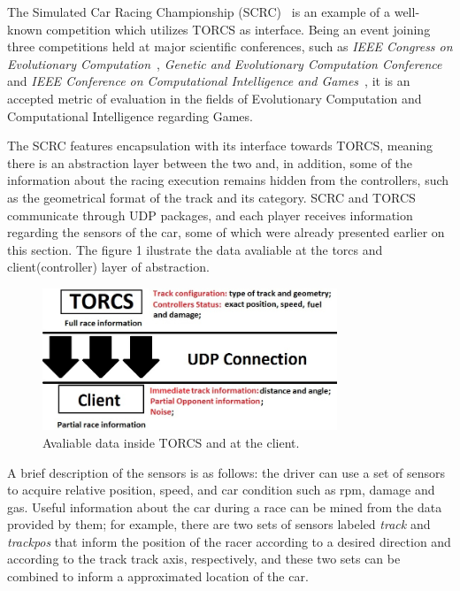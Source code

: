 	The Simulated Car Racing Championship (SCRC)~\cite{SCR} is an example of a well-known competition which utilizes
	TORCS as interface. Being an event joining three competitions held at major scientific conferences, such as
	\emph{IEEE Congress on Evolutionary Computation}~\cite{CEC}, \emph{Genetic and Evolutionary Computation
	Conference}~\cite{GECCO} and \emph{IEEE Conference on Computational Intelligence and Games}~\cite{CIG}, it is
	an accepted	metric of evaluation in the fields of Evolutionary Computation and Computational Intelligence
	regarding Games.
	
	The SCRC features encapsulation with its interface towards TORCS, meaning there is an abstraction layer between
	the two and, in addition, some of the information about the racing execution remains hidden from the controllers,
	such as the geometrical format of the track and its category. SCRC and TORCS communicate through UDP packages,
	and each player receives information regarding the sensors of the car, some of which were already presented
	earlier on this section. The figure 1 ilustrate the data avaliable at the torcs and client(controller) layer 
	of abstraction. 

   	\begin{figure}[h]
	\centering
	\includegraphics[width=250pt]{Figure1}
	\caption{\label{fig:Figure1}Avaliable data inside TORCS and at the client.}
	\end{figure}
	
	A brief description of the sensors is as follows: the driver can use a set of sensors to acquire relative
	position, speed, and car condition such as rpm, damage and gas. Useful information about the car during a
	race can be mined from the data provided by them; for example, there are two sets of sensors labeled
	\emph{track} and \emph{trackpos} that inform the position of the racer according to a desired direction and
	according to the track track axis, respectively, and these two sets can be combined to inform a approximated
	location of the car. 
	
